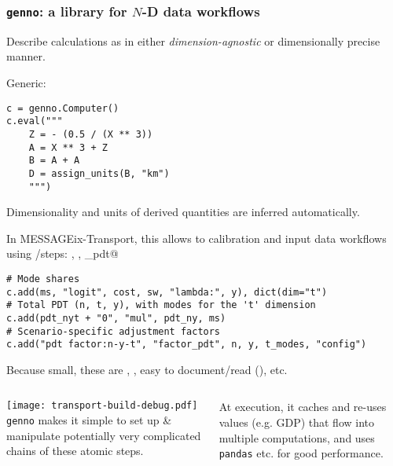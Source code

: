 \documentclass[12pt,aspectratio=169]{beamer}
\begin{document}
\begin{frame}
\frametitle{\texttt{genno}: a library for $N$-D data workflows}

Describe calculations as  in either \emph{dimension-agnostic} or dimensionally precise manner.

\medskip
Generic:
\begin{verbatim}
c = genno.Computer()
c.eval("""
    Z = - (0.5 / (X ** 3))
    A = X ** 3 + Z
    B = A + A
    D = assign_units(B, "km")
    """)
\end{verbatim}
Dimensionality and units of derived quantities are inferred automatically.

\framebreak
In MESSAGEix-Transport, this allows to  calibration and input data workflows using /steps: \verb@logit@, \verb@mul@, \verb@factor_pdt@
\begin{verbatim}
# Mode shares
c.add(ms, "logit", cost, sw, "lambda:", y), dict(dim="t")
# Total PDT (n, t, y), with modes for the 't' dimension
c.add(pdt_nyt + "0", "mul", pdt_ny, ms)
# Scenario-specific adjustment factors
c.add("pdt factor:n-y-t", "factor_pdt", n, y, t_modes, "config")
\end{verbatim}

\medskip
Because small, these are , , easy to document/read (), etc.

\framebreak
\begin{columns}
\column[T]{0.6\paperwidth}
\texttt{[image: transport-build-debug.pdf]}
\column[T]{0.3\paperwidth}
\texttt{genno} makes it simple to set up \& manipulate potentially very complicated chains of these atomic steps.

\medskip
At execution, it caches and re-uses values (e.g. GDP) that flow into multiple computations, and uses \texttt{pandas} etc. for good performance.
\end{columns}
\end{frame}
\end{document}
